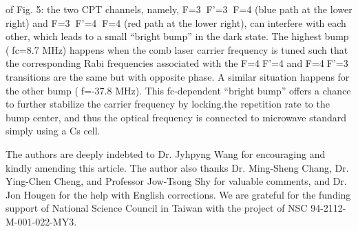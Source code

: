 \documentclass[%
reprint,  
aps,
prl,
showpacs,
]{revtex4}
\begin{document}
of Fig. 5: the two CPT channels, namely, F=3F’=3F=4 (blue path at the lower right) 
and F=3F’=4F=4 (red path at the lower right), can interfere with each other, 
which leads to a small ``bright bump'' in the dark state. The highest bump (fc=8.7 MHz) 
happens when the comb laser carrier frequency is tuned such that the corresponding Rabi 
frequencies associated with the F=4F’=4 and F=4F’=3 transitions are the same but with 
opposite phase.  A similar situation happens for the other bump (f=-37.8 MHz). This 
fc-dependent ``bright bump'' offers a chance to further stabilize the carrier frequency 
by locking.the repetition rate to the bump center, and thus the optical frequency is 
connected to microwave standard simply using a Cs cell.    

The authors are deeply indebted to Dr. Jyhpyng Wang for encouraging and kindly 
amending this article.  The author also thanks Dr. Ming-Sheng Chang, Dr. Ying-Chen Cheng, 
and Professor Jow-Tsong Shy for valuable comments, and Dr. Jon Hougen for the help 
with English corrections. We are grateful for the funding support of National 
Science Council in Taiwan with the project of NSC 94-2112-M-001-022-MY3.
\end{document}
